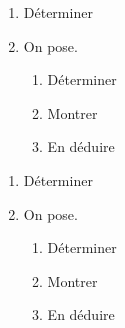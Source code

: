 \documentclass[a4paper,addpoints,12pt]{exam}
\begin{document}
\begin{exos}[style1]
	
	\begin{enumerate}
		\item Déterminer 
		\item On pose.
		\begin{enumerate}
			\item Déterminer 
			\item Montrer 
			\item En déduire 
			
		\end{enumerate}
		
	\end{enumerate}
	\end{exos}
	
	\begin{exos}[style1]	
	\begin{enumerate}
		\item Déterminer 
		\item On pose.
		\begin{enumerate}
			\item Déterminer 
			\item Montrer 
			\item En déduire 
			
		\end{enumerate}
		
	\end{enumerate}
	\end{exos}
	
	
\end{document}
